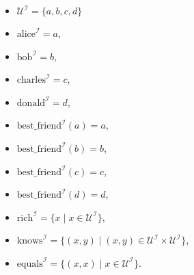 \documentclass[solution]{acAssignment}
\begin{document}
\begin{enumerate}
        \begin{acSolution}
            \begin{itemize}
                \item $\mathcal{U}^\mathcal{I} = \{a, b, c, d\}$
                \item $\mathrm{alice}^\mathcal{I} = a$,
                \item $\mathrm{bob}^\mathcal{I} = b$,
                \item $\mathrm{charles}^\mathcal{I} = c$,
                \item $\mathrm{donald}^\mathcal{I} = d$,
                \item $\mathrm{best\_friend}^\mathcal{I}(a) = a$,
                \item $\mathrm{best\_friend}^\mathcal{I}(b) = b$,
                \item $\mathrm{best\_friend}^\mathcal{I}(c) = c$,
                \item $\mathrm{best\_friend}^\mathcal{I}(d) = d$,
                \item $\mathrm{rich}^\mathcal{I} = \{x \mid x \in \mathcal{U}^\mathcal{I}\}$,
                \item $\mathrm{knows}^\mathcal{I} = \{(x,y) \mid (x, y) \in \mathcal{U}^\mathcal{I} \times \mathcal{U}^\mathcal{I}\}$,
                \item $\mathrm{equals}^\mathcal{I} = \{(x, x) \mid x \in \mathcal{U}^\mathcal{I}\}$.
            \end{itemize}
        \end{acSolution}
\end{enumerate}
\end{document}
